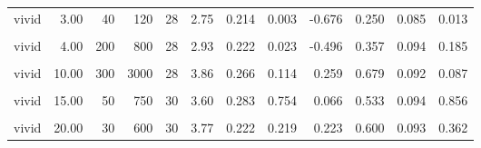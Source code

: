 \documentclass[
]{article}
\begin{document}
\begin{longtable}[t]{lrrrrrrlrrrl}
\hspace{1em}vivid & 3.00 & 40 & 120 & 28 & 2.75 & 0.214 & 0.003 & -0.676 & 0.250 & 0.085 & 0.013\\
\hspace{1em}\cellcolor{gray!10}{vivid} & \cellcolor{gray!10}{4.00} & \cellcolor{gray!10}{20} & \cellcolor{gray!10}{80} & \cellcolor{gray!10}{30} & \cellcolor{gray!10}{3.17} & \cellcolor{gray!10}{0.229} & \cellcolor{gray!10}{0.179} & \cellcolor{gray!10}{-0.270} & \cellcolor{gray!10}{0.433} & \cellcolor{gray!10}{0.094} & \cellcolor{gray!10}{0.585}\\
\hspace{1em}vivid & 4.00 & 200 & 800 & 28 & 2.93 & 0.222 & 0.023 & -0.496 & 0.357 & 0.094 & 0.185\\
\hspace{1em}\cellcolor{gray!10}{vivid} & \cellcolor{gray!10}{10.00} & \cellcolor{gray!10}{40} & \cellcolor{gray!10}{400} & \cellcolor{gray!10}{30} & \cellcolor{gray!10}{3.50} & \cellcolor{gray!10}{0.247} & \cellcolor{gray!10}{0.941} & \cellcolor{gray!10}{0.000} & \cellcolor{gray!10}{0.567} & \cellcolor{gray!10}{0.094} & \cellcolor{gray!10}{0.585}\\
\hspace{1em}vivid & 10.00 & 300 & 3000 & 28 & 3.86 & 0.266 & 0.114 & 0.259 & 0.679 & 0.092 & 0.087\\
\hspace{1em}\cellcolor{gray!10}{vivid} & \cellcolor{gray!10}{15.00} & \cellcolor{gray!10}{20} & \cellcolor{gray!10}{300} & \cellcolor{gray!10}{28} & \cellcolor{gray!10}{3.46} & \cellcolor{gray!10}{0.280} & \cellcolor{gray!10}{0.935} & \cellcolor{gray!10}{-0.025} & \cellcolor{gray!10}{0.607} & \cellcolor{gray!10}{0.096} & \cellcolor{gray!10}{0.345}\\
\hspace{1em}vivid & 15.00 & 50 & 750 & 30 & 3.60 & 0.283 & 0.754 & 0.066 & 0.533 & 0.094 & 0.856\\
\hspace{1em}\cellcolor{gray!10}{vivid} & \cellcolor{gray!10}{20.00} & \cellcolor{gray!10}{10} & \cellcolor{gray!10}{200} & \cellcolor{gray!10}{28} & \cellcolor{gray!10}{3.57} & \cellcolor{gray!10}{0.259} & \cellcolor{gray!10}{0.601} & \cellcolor{gray!10}{0.053} & \cellcolor{gray!10}{0.643} & \cellcolor{gray!10}{0.094} & \cellcolor{gray!10}{0.185}\\
\hspace{1em}vivid & 20.00 & 30 & 600 & 30 & 3.77 & 0.222 & 0.219 & 0.223 & 0.600 & 0.093 & 0.362\\

\end{longtable}
\end{document}
